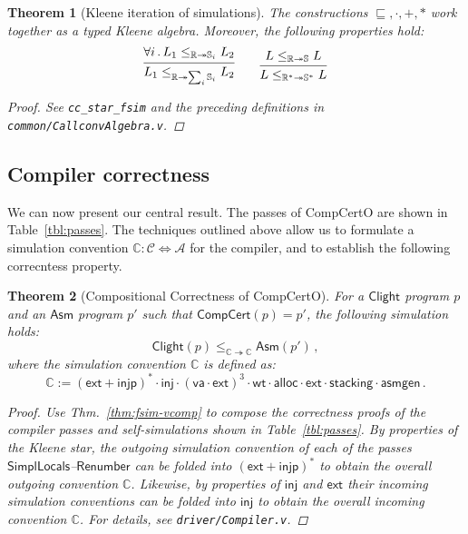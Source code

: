 \documentclass[11pt,oneside,draft]{book}
\newtheorem{theorem}{Theorem}[chapter]
\theoremstyle{definition}
\newcommand{\kw}[1]{\ensuremath{ \mathsf{#1} }}
\newcommand{\scref}{\sqsubseteq} %
\begin{document}
\begin{theorem}[Kleene iteration of simulations] \label{thm:simk} %
The constructions ${\scref}, {\cdot}, {+}, {*}$
work together as a typed Kleene algebra.
Moreover, the following properties hold:
\[
  \begin{prooftree}
    \hypo{\forall i \,.\,
      L_1 \le_{\mathbb{R} \twoheadrightarrow \mathbb{S}_i} L_2}
    \infer1{
      L_1 \le_{\mathbb{R} \twoheadrightarrow \sum_i \mathbb{S}_i} L_2}
  \end{prooftree}
  \qquad
  \begin{prooftree}
    \hypo{L \le_{\mathbb{R} \twoheadrightarrow \mathbb{S}} L}
    \infer1{L \le_{\mathbb{R}^* \twoheadrightarrow \mathbb{S}^*} L}
  \end{prooftree}
\]
\begin{proof}
See \texttt{cc\_star\_fsim} and the preceding definitions
in \texttt{common/CallconvAlgebra.v}.
\end{proof}
\end{theorem}


\subsection{Compiler correctness} \label{sec:comppass} %

We can now present our central result.
The passes of CompCertO are shown in Table~\ref{tbl:passes}.
The techniques outlined above allow us to formulate
a simulation convention
$\mathbb{C} : \mathcal{C} \Leftrightarrow \mathcal{A}$
for the compiler, %
and to establish the following correcntess property.

\begin{theorem}[Compositional Correctness of CompCertO] \label{thm:compc} %
For a \kw{Clight} program $p$
and an \kw{Asm} program $p'$ such that
$\kw{CompCert}(p) = p'$,
the following simulation holds:
\[
    \kw{Clight}(p) \le_{\mathbb{C} \twoheadrightarrow \mathbb{C}}
    \kw{Asm}(p') \,,
\]
where the simulation convention $\mathbb{C}$ is defined as:
\[
    \mathbb{C} := (\kw{ext} + \kw{injp})^* \cdot \kw{inj} \cdot
      (\kw{va} \cdot \kw{ext})^3 \cdot
      \kw{wt} \cdot \kw{alloc} \cdot
      \kw{ext} \cdot %
      \kw{stacking} \cdot
      \kw{asmgen}
      \,.
\]
\begin{proof}
Use Thm.~\ref{thm:fsim-vcomp} to compose
the correctness proofs of the compiler passes and
self-simulations shown in Table~\ref{tbl:passes}.
By properties of the Kleene star,
the outgoing simulation convention of each of the
passes \kw{SimplLocals}--\kw{Renumber} %
can be folded into $(\kw{ext} + \kw{injp})^*$
to obtain the overall outgoing convention $\mathbb{C}$.
Likewise, by properties of $\kw{inj}$ and $\kw{ext}$
their incoming simulation conventions
can be folded into $\kw{inj}$
to obtain the overall incoming convention $\mathbb{C}$.
For details, see \texttt{driver/Compiler.v}.
\end{proof}
\end{theorem}
\end{document}
